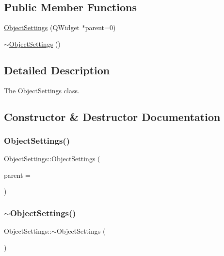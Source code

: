 \subsection*{Public Member Functions}
\begin{DoxyCompactItemize}
\item 
\hyperlink{class_object_settings_aa7ea354843a408eeac937c76de954eeb}{Object\+Settings} (Q\+Widget $\ast$parent=0)
\item 
\hyperlink{class_object_settings_ad93bcbc973825c0052c246039fe6d4d0}{$\sim$\+Object\+Settings} ()
\end{DoxyCompactItemize}


\subsection{Detailed Description}
The \hyperlink{class_object_settings}{Object\+Settings} class. 

\subsection{Constructor \& Destructor Documentation}
\mbox{\label{class_object_settings_aa7ea354843a408eeac937c76de954eeb}} 
\subsubsection{\texorpdfstring{Object\+Settings()}{ObjectSettings()}}
{\footnotesize\ttfamily Object\+Settings\+::\+Object\+Settings (\begin{DoxyParamCaption}\item[{Q\+Widget $\ast$}]{parent = {} }\end{DoxyParamCaption})\hspace{0.3cm}{\ttfamily [explicit]}}

\mbox{\label{class_object_settings_ad93bcbc973825c0052c246039fe6d4d0}} 
\subsubsection{\texorpdfstring{$\sim$\+Object\+Settings()}{~ObjectSettings()}}
{\footnotesize\ttfamily Object\+Settings\+::$\sim$\+Object\+Settings (\begin{DoxyParamCaption}{ }\end{DoxyParamCaption})}



